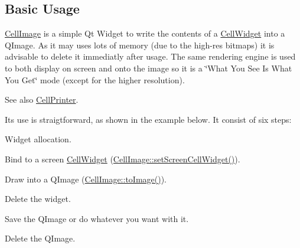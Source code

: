 \hypertarget{classHurricane_1_1CellImage_secImageBasicUsage}{}\subsection{Basic Usage}\label{classHurricane_1_1CellImage_secImageBasicUsage}
\mbox{\hyperlink{classHurricane_1_1CellImage}{Cell\+Image}} is a simple Qt Widget to write the contents of a \mbox{\hyperlink{classHurricane_1_1CellWidget}{Cell\+Widget}} into a Q\+Image. As it may uses lots of memory (due to the high-\/res bitmaps) it is advisable to delete it immediatly after usage. The same rendering engine is used to both display on screen and onto the image so it is a \char`\"{}\+What You
                   See Is What You Get\char`\"{} mode (except for the higher resolution).

\begin{DoxySeeAlso}{See also}
\mbox{\hyperlink{classHurricane_1_1CellPrinter}{Cell\+Printer}}.
\end{DoxySeeAlso}
It\textquotesingle{}s use is straigtforward, as shown in the example below. It consist of six steps\+: 
\begin{DoxyEnumerate}
\item Widget allocation. 
\item Bind to a screen \mbox{\hyperlink{classHurricane_1_1CellWidget}{Cell\+Widget}} (\mbox{\hyperlink{classHurricane_1_1CellImage_a3e140125664a1088020d9bedc7de0f4e}{Cell\+Image\+::set\+Screen\+Cell\+Widget()}}). 
\item Draw into a Q\+Image (\mbox{\hyperlink{classHurricane_1_1CellImage_a90ed9b8a07f4302cbeecf52a95ef5578}{Cell\+Image\+::to\+Image()}}). 
\item Delete the widget. 
\item Save the Q\+Image or do whatever you want with it. 
\item Delete the Q\+Image. 
\end{DoxyEnumerate}

